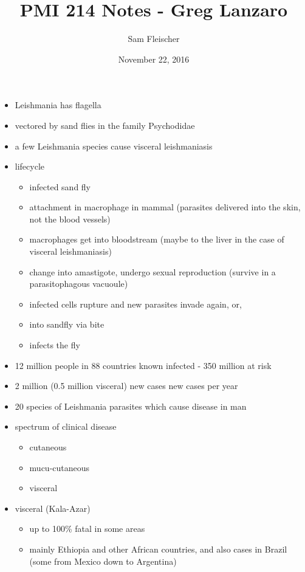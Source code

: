 \documentclass{article}
\title{PMI 214 Notes - Greg Lanzaro}
\author{Sam Fleischer}
\date{November 22, 2016}
\begin{document}
    \maketitle

    \begin{itemize}
        \item Leishmania has flagella
        \item vectored by sand flies in the family Psychodidae
        \item a few Leishmania species cause visceral leishmaniasis
        \item lifecycle
        \begin{itemize}
            \item infected sand fly
            \item attachment in macrophage in mammal (parasites delivered into the skin, not the blood vessels)
            \item macrophages get into bloodstream (maybe to the liver in the case of visceral leishmaniasis)
            \item change into amastigote, undergo sexual reproduction (survive in a parasitophagous vacuoule)
            \item infected cells rupture and new parasites invade again, or,
            \item into sandfly via bite
            \item infects the fly
        \end{itemize}
        \item 12 million people in 88 countries known infected - 350 million at risk
        \item 2 million (0.5 million visceral) new cases new cases per year
        \item 20 species of Leishmania parasites which cause disease in man
        \item spectrum of clinical disease
        \begin{itemize}
            \item cutaneous
            \item mucu-cutaneous
            \item visceral
        \end{itemize}
        \item visceral (Kala-Azar)
        \begin{itemize}
            \item up to 100\% fatal in some areas
            \item mainly Ethiopia and other African countries, and also cases in Brazil (some from Mexico down to Argentina)

\end{itemize}
\end{itemize}
\end{document}
